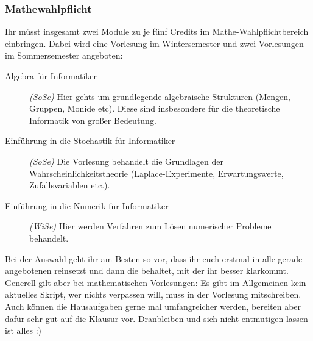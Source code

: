 \subsubsection{Mathewahlpflicht}
Ihr müsst insgesamt zwei Module zu je fünf Credits
	im Mathe-Wahlpflichtbereich einbringen. Dabei wird eine Vorlesung im Wintersemester und zwei
	Vorlesungen im Sommersemester angeboten:

	
	\begin{description} 
		\item[Algebra für Informatiker] \emph{(SoSe)} Hier gehts um grundlegende
		algebraische Strukturen (Mengen, Gruppen, Monide etc). Diese sind insbesondere für die
		theoretische Informatik von großer Bedeutung.
		\item[Einführung in die Stochastik für Informatiker] \emph{(SoSe)} Die
		Vorlesung behandelt die Grundlagen der
		Wahrscheinlichkeitstheorie (Laplace-Experimente,
		Erwartungswerte, Zufallsvariablen etc.). 
		\item[Einführung in die Numerik für Informatiker] \emph{(WiSe)} Hier werden Verfahren zum Lösen numerischer Probleme behandelt. 
	\end{description}

	Bei der Auswahl geht ihr am Besten so vor, dass ihr euch erstmal
	in alle gerade angebotenen reinsetzt und dann die behaltet, mit der ihr besser
	klarkommt. Generell gilt aber bei mathematischen Vorlesungen: Es
	gibt im Allgemeinen kein aktuelles Skript, wer nichts verpassen
	will, muss in der Vorlesung mitschreiben. Auch können die
	Hausaufgaben gerne mal umfangreicher werden, bereiten aber dafür
	sehr gut auf die Klausur vor. Dranbleiben und sich nicht
	entmutigen lassen ist alles :)